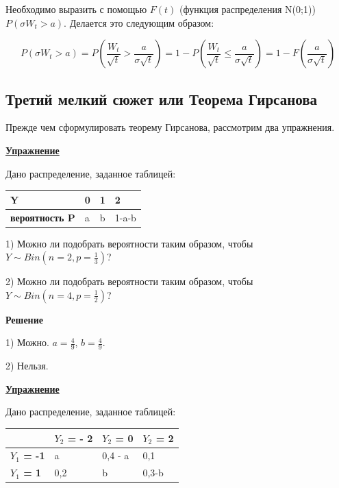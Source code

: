 \documentclass[a4paper]{article}
\begin{document}
  Необходимо выразить с помощью $F(t)$ (функция распределения N(0;1)) $P(\sigma W_t > a)$. Делается это следующим образом:

  \begin{equation*}
  P(\sigma W_t > a) = P(\frac{W_t}{\sqrt{t}} > \frac{a}{\sigma \sqrt{t}}) = 1-P(\frac{W_t}{\sqrt{t}} \le \frac{a}{\sigma \sqrt{t}} ) = 1 - F(\frac{a}{\sigma \sqrt{t}})
  \end{equation*}

  \subsection {Третий мелкий сюжет или Теорема Гирсанова}

  Прежде чем сформулировать теорему Гирсанова, рассмотрим два упражнения.
  \vspace{5mm}

  \par {\bf\underline{Упражнение}}

  Дано распределение, заданное таблицей:
  \vspace{5mm}

\begin{tabular}{llll}
\hline
\textbf{Y}             & 0 & 1 & 2     \\ \hline
\textbf{вероятность P} & a & b & 1-a-b \\ \hline
\end{tabular}
\vspace{5mm}



1) Можно ли подобрать вероятности таким образом, чтобы $Y \sim Bin(n=2,p=\frac{1}{3})$?

2) Можно ли подобрать вероятности таким образом, чтобы $Y \sim Bin(n=4,p=\frac{1}{2})$?

\vspace{5mm}

\par {\bf{Решение}}

  1) Можно. $a = \frac{4}{9}$, $b = \frac{4}{9}$.

  2) Нельзя.

  \pagebreak

  \par {\bf\underline{Упражнение}}

   Дано распределение, заданное таблицей:

  \vspace{5mm}
\begin{tabular}{llll}
\hline
\textbf{}        & \textbf{$Y_2$ = - 2} & \textbf{$Y_2$ = 0} & \textbf{$Y_2$ = 2} \\ \hline
\textbf{$Y_1$ = -1} & a               & 0,4 - a         & 0,1             \\ \hline
\textbf{$Y_1$ = 1}  & 0,2             & b               & 0,3-b
\end{tabular}
\vspace{5mm}
\end{document}
